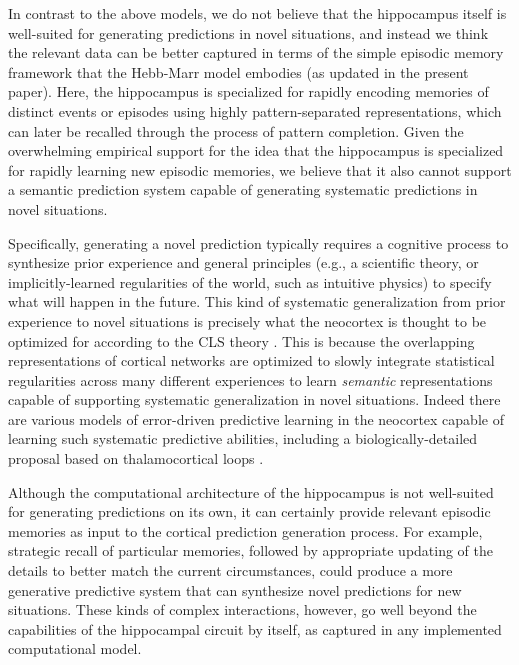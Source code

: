 \documentclass[10pt,letterpaper]{article}
\begin{document}
In contrast to the above models, we do not believe that the hippocampus itself is well-suited for generating predictions in novel situations, and instead we think the relevant data can be better captured in terms of the simple episodic memory framework that the Hebb-Marr model embodies  (as updated in the present paper).  Here, the hippocampus is specialized for rapidly encoding memories of distinct events or episodes using highly pattern-separated representations, which can later be recalled through the process of pattern completion.  Given the overwhelming empirical support for the idea that the hippocampus is specialized for rapidly learning new episodic memories, we believe that it also cannot support a semantic prediction system capable of generating systematic predictions in novel situations.

Specifically, generating a novel prediction typically requires a cognitive process to synthesize prior experience and general principles (e.g., a scientific theory, or implicitly-learned regularities of the world, such as intuitive physics) to specify what will happen in the future.  This kind of systematic generalization from prior experience to novel situations is precisely what the neocortex is thought to be optimized for according to the CLS theory \cite{McClellandMcNaughtonOReilly95,OReillyBhattacharyyaHowardEtAl14,OReillyRanganathRussin21}.  This is because the overlapping representations of cortical networks are optimized to slowly integrate statistical regularities across many different experiences to learn \emph{semantic} representations capable of supporting systematic generalization in novel situations. Indeed there are various models of error-driven predictive learning in the neocortex capable of learning such systematic predictive abilities, including a biologically-detailed proposal based on thalamocortical loops \cite{OReillyRussinZolfagharEtAl21}. 

Although the computational architecture of the hippocampus is not well-suited for generating predictions on its own, it can certainly provide relevant episodic memories as input to the cortical prediction generation process.  For example, strategic recall of particular memories, followed by appropriate updating of the details to better match the current circumstances, could produce a more generative predictive system that can synthesize novel predictions for new situations. These kinds of complex interactions, however, go well beyond the capabilities of the hippocampal circuit by itself, as captured in any implemented computational model.
\end{document}
